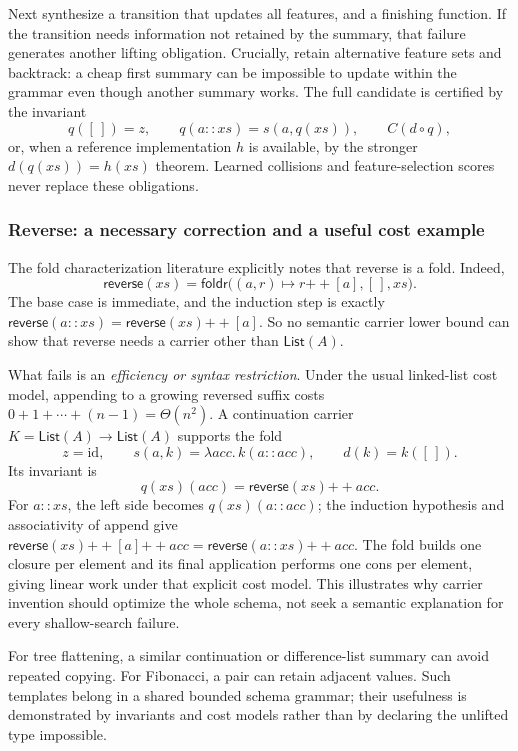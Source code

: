 \documentclass[11pt,a4paper]{article}
\newcommand{\List}{\mathsf{List}}
\newcommand{\rev}{\mathsf{reverse}}
\newcommand{\foldr}{\mathsf{foldr}}
\newcommand{\nil}{[\,]}
\newcommand{\cons}{\mathbin{::}}
\newcommand{\app}{\mathbin{+\!+}}
\theoremstyle{remark}
\begin{document}
Next synthesize a transition that updates all features, and a finishing
function. If the transition needs information not retained by the summary,
that failure generates another lifting obligation. Crucially, retain
alternative feature sets and backtrack: a cheap first summary can be
impossible to update within the grammar even though another summary works.
The full candidate is certified by the invariant
\[
 q(\nil)=z,\qquad q(a\cons xs)=s(a,q(xs)),
 \qquad C(d\circ q),
\]
or, when a reference implementation $h$ is available, by the stronger
$d(q(xs))=h(xs)$ theorem. Learned collisions and feature-selection scores
never replace these obligations.

\subsubsection*{Reverse: a necessary correction and a useful cost example}

The fold characterization literature explicitly notes that reverse is a
fold.\cite{whenfold} Indeed,
\begin{equation}\label{eq:reverse-fold}
 \rev(xs)=\foldr\bigl((a,r)\mapsto r\app[a],\nil,xs\bigr).
\end{equation}
The base case is immediate, and the induction step is exactly
$\rev(a\cons xs)=\rev(xs)\app[a]$. So no semantic carrier lower bound can
show that reverse needs a carrier other than $\List(A)$.

What fails is an \emph{efficiency or syntax restriction}. Under the usual
linked-list cost model, appending to a growing reversed suffix costs
$0+1+\cdots+(n-1)=\Theta(n^2)$. A continuation carrier
$K=\List(A)\to\List(A)$ supports the fold
\[
 z=\mathrm{id},\qquad s(a,k)=\lambda acc.\,k(a\cons acc),
 \qquad d(k)=k(\nil).
\]
Its invariant is
\begin{equation}\label{eq:reverse-cont}
 q(xs)(acc)=\rev(xs)\app acc.
\end{equation}
For $a\cons xs$, the left side becomes $q(xs)(a\cons acc)$; the induction
hypothesis and associativity of append give
$\rev(xs)\app[a]\app acc=\rev(a\cons xs)\app acc$.
The fold builds one closure per element and its final application performs
one cons per element, giving linear work under that explicit cost model.
This illustrates why carrier invention should optimize the whole schema,
not seek a semantic explanation for every shallow-search failure.

For tree flattening, a similar continuation or difference-list summary can
avoid repeated copying. For Fibonacci, a pair can retain adjacent values.
Such templates belong in a shared bounded schema grammar; their usefulness
is demonstrated by invariants and cost models rather than by declaring the
unlifted type impossible.
\end{document}
